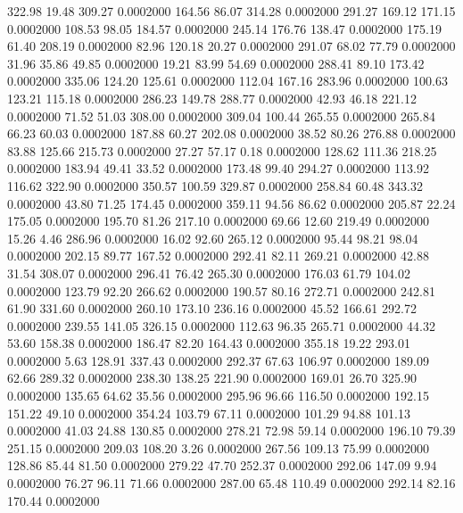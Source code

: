  322.98   19.48  309.27   0.0002000
 164.56   86.07  314.28   0.0002000
 291.27  169.12  171.15   0.0002000
 108.53   98.05  184.57   0.0002000
 245.14  176.76  138.47   0.0002000
 175.19   61.40  208.19   0.0002000
  82.96  120.18   20.27   0.0002000
 291.07   68.02   77.79   0.0002000
  31.96   35.86   49.85   0.0002000
  19.21   83.99   54.69   0.0002000
 288.41   89.10  173.42   0.0002000
 335.06  124.20  125.61   0.0002000
 112.04  167.16  283.96   0.0002000
 100.63  123.21  115.18   0.0002000
 286.23  149.78  288.77   0.0002000
  42.93   46.18  221.12   0.0002000
  71.52   51.03  308.00   0.0002000
 309.04  100.44  265.55   0.0002000
 265.84   66.23   60.03   0.0002000
 187.88   60.27  202.08   0.0002000
  38.52   80.26  276.88   0.0002000
  83.88  125.66  215.73   0.0002000
  27.27   57.17    0.18   0.0002000
 128.62  111.36  218.25   0.0002000
 183.94   49.41   33.52   0.0002000
 173.48   99.40  294.27   0.0002000
 113.92  116.62  322.90   0.0002000
 350.57  100.59  329.87   0.0002000
 258.84   60.48  343.32   0.0002000
  43.80   71.25  174.45   0.0002000
 359.11   94.56   86.62   0.0002000
 205.87   22.24  175.05   0.0002000
 195.70   81.26  217.10   0.0002000
  69.66   12.60  219.49   0.0002000
  15.26    4.46  286.96   0.0002000
  16.02   92.60  265.12   0.0002000
  95.44   98.21   98.04   0.0002000
 202.15   89.77  167.52   0.0002000
 292.41   82.11  269.21   0.0002000
  42.88   31.54  308.07   0.0002000
 296.41   76.42  265.30   0.0002000
 176.03   61.79  104.02   0.0002000
 123.79   92.20  266.62   0.0002000
 190.57   80.16  272.71   0.0002000
 242.81   61.90  331.60   0.0002000
 260.10  173.10  236.16   0.0002000
  45.52  166.61  292.72   0.0002000
 239.55  141.05  326.15   0.0002000
 112.63   96.35  265.71   0.0002000
  44.32   53.60  158.38   0.0002000
 186.47   82.20  164.43   0.0002000
 355.18   19.22  293.01   0.0002000
   5.63  128.91  337.43   0.0002000
 292.37   67.63  106.97   0.0002000
 189.09   62.66  289.32   0.0002000
 238.30  138.25  221.90   0.0002000
 169.01   26.70  325.90   0.0002000
 135.65   64.62   35.56   0.0002000
 295.96   96.66  116.50   0.0002000
 192.15  151.22   49.10   0.0002000
 354.24  103.79   67.11   0.0002000
 101.29   94.88  101.13   0.0002000
  41.03   24.88  130.85   0.0002000
 278.21   72.98   59.14   0.0002000
 196.10   79.39  251.15   0.0002000
 209.03  108.20    3.26   0.0002000
 267.56  109.13   75.99   0.0002000
 128.86   85.44   81.50   0.0002000
 279.22   47.70  252.37   0.0002000
 292.06  147.09    9.94   0.0002000
  76.27   96.11   71.66   0.0002000
 287.00   65.48  110.49   0.0002000
 292.14   82.16  170.44   0.0002000
